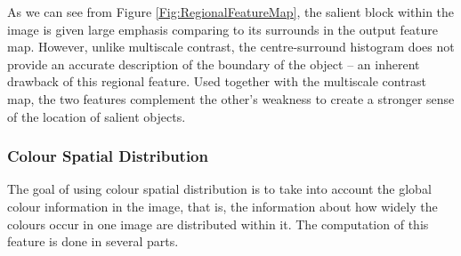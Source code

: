 \documentclass[10pt,twocolumn,letterpaper]{article}
\begin{document}
As we can see from Figure \ref{Fig:RegionalFeatureMap}, the salient block within the image is given large emphasis comparing to its surrounds in the output feature map.  However, unlike multiscale contrast, the centre-surround histogram does not provide an accurate description of the boundary of the object -- an inherent drawback of this regional feature. Used together with the multiscale contrast map, the two features complement the other's weakness to create a stronger sense of the location of salient objects.

\subsubsection{Colour Spatial Distribution}

The goal of using colour spatial distribution is to take into account the global colour information in the image, that is, the information about how widely the colours occur in 
one image are distributed within it.  The computation of this feature is done in several parts.
\end{document}
